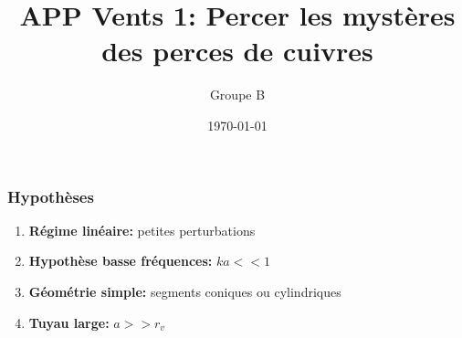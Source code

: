 

\title[]{APP Vents 1: Percer les mystères des perces de cuivres} %

\author{Groupe B} %
\medskip
\date{\today} %



\begin{frame}
\titlepage %
\end{frame}

\begin{frame}
  \frametitle{Hypothèses}
  \begin{enumerate}
    \item \textbf{Régime linéaire:} petites perturbations
    \item \textbf{Hypothèse basse fréquences:} $ka <<1$
    \item \textbf{Géométrie simple:} segments coniques ou cylindriques
    \item \textbf{Tuyau large:} $a >> r_v$
  \end{enumerate}
\end{frame}


